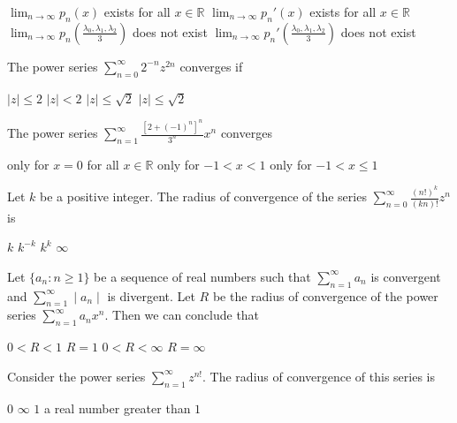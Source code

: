 \documentclass[10pt]{exam}
\newcommand{\R}{\ensuremath{\mathbb{R}}}
\begin{document}
\begin{questions}
\begin{checkboxes}
\choice $ \lim_{n\rightarrow \infty} p_n(x) $ exists for all $x \in \R$ 
\choice $ \lim_{n\rightarrow \infty} p_n'(x) $ exists for all $x \in \R$ 
\choice $ \lim_{n\rightarrow \infty} p_n\left ( \frac{\lambda_0, \lambda_1, \lambda_2}{3} \right ) $ does not  exist 
\choice $ \lim_{n\rightarrow \infty} p_n'\left ( \frac{\lambda_0, \lambda_1, \lambda_2}{3} \right ) $ does not  exist 
\end{checkboxes}

\question
The power series $\sum_{n=0}^{\infty} 2^{-n}z^{2n}$ converges if 

\begin{oneparchoices}
\choice $|z| \leq 2$
\choice $|z| < 2$
\choice $|z| \leq \sqrt{2}$
\choice $|z| \leq \sqrt{2}$
\end{oneparchoices}

\question
The power series $\sum_{n=1}^{\infty} \frac{[2+(-1)^n]^n}{3^n} x^n$ converges

\begin{choices}
\choice only for $x=0$
\choice for all $x \in \mathbb{R}$
\choice only for $-1<x<1$
\choice only for $-1<x\leq 1$  
\end{choices}

\question 
Let $k$ be a positive integer. The radius of convergence of the series $\sum_{n=0}^{\infty} \frac{(n!)^k}{(kn)!}z^n $ is 

\begin{oneparchoices}
\choice $k$
\choice $k^{-k}$
\choice $k^{k}$
\choice $\infty$
\end{oneparchoices}

\question 
Let $\{a_n : n \geq 1 \}$ be a sequence of real numbers such that $\sum_{n=1}^{\infty} a_n $ is convergent and $\sum_{n =1}^{\infty} \mid a_n \mid $ is divergent. Let $R$ be the radius of convergence of the power series $\sum_{n=1}^{\infty} a_n x^n$. Then we can conclude that 

\begin{oneparchoices}
\choice $0 < R < 1$
\choice $R = 1$
\choice $0 <R < \infty$
\choice $R =\infty $
\end{oneparchoices}


\question
Consider the power series $\sum_{n=1}^{\infty} z^{n!}$. The radius of convergence of this series is 

\begin{oneparchoices}
\choice $0$
\choice $\infty$
\choice $1$
\choice a real number greater than $1$
\end{oneparchoices}


\end{questions}
\end{document}
